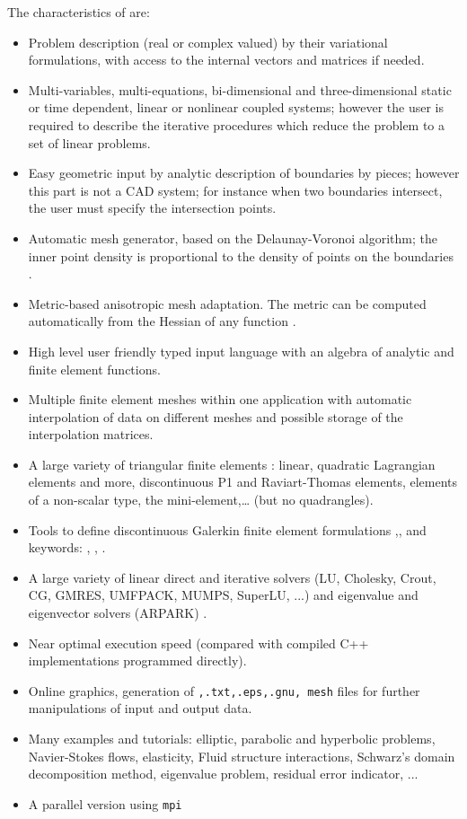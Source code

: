 \documentclass[a4paper,twoside,12pt]{book}
\begin{document}
The characteristics of \freefempp are:
\begin{itemize}
\item Problem description (real or complex valued) by their variational formulations,
with access to the internal vectors and matrices if needed.
%
\item Multi-variables, multi-equations, bi-dimensional and three-dimensional
 static or time dependent, linear or nonlinear
coupled systems; however the user is required to describe the
iterative procedures which reduce the problem to a set of linear
problems.
%
\item Easy geometric input by analytic description of boundaries by pieces;
however this part is not a CAD system; for instance when two
boundaries intersect, the user must specify the intersection points.
%
\item Automatic mesh generator, based on the Delaunay-Voronoi
algorithm; the inner point density is proportional to the density of
points on the boundaries \cite{George}.
%
\item Metric-based anisotropic mesh adaptation. The metric can be
computed automatically from the Hessian of any \freefempp function
\cite{bamg}.
%
\item High level user friendly typed input language with an algebra
of analytic and finite element functions.
%
\item  Multiple finite element meshes within one application with
automatic interpolation of data on different meshes and possible
storage of the interpolation matrices.
%
\item A large variety of triangular finite elements : linear, quadratic
 Lagrangian elements and more, discontinuous P1 and Raviart-Thomas elements,
 elements of a non-scalar type, the mini-element,\dots{} (but no quadrangles).
%
\item Tools to define discontinuous Galerkin finite element formulations
,, and keywords: , , .
%
\item A large variety of linear direct and iterative solvers
(LU, Cholesky, Crout, CG, GMRES, UMFPACK, MUMPS, SuperLU, ...) and eigenvalue and
eigenvector solvers (ARPARK) .
%
\item Near optimal execution speed (compared with compiled C++
implementations programmed directly).

\item Online graphics, generation of \texttt{,.txt,.eps,.gnu, mesh} files
  for further manipulations of input and output data.
%
\item Many examples and tutorials: elliptic, parabolic and hyperbolic problems,
 Navier-Stokes flows, elasticity, Fluid structure interactions,
Schwarz's domain decomposition method, eigenvalue problem, residual
error indicator, ...
%
\item A parallel version using \texttt{mpi}
\end{itemize}
\end{document}
